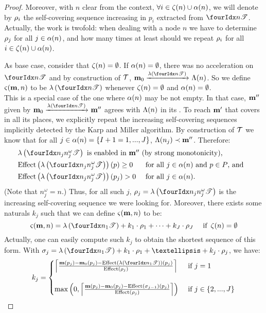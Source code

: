 \begin{proof}
  Moreover, with $n$ clear from the context, $\forall i \in \operatorname{\zeta}(n) \cup \operatorname{\alpha}(n)$, we will denote by $\iscs{i}$ the self-covering sequence increasing in $p_i$ extracted from $\treepath{n}$.
  Actually, the work is twofold: when dealing with a node $n$ we have to determine $\iscs{j}$ for all $j \in \operatorname{\alpha}(n)$, and how many times at least should we repeat $\iscs{i}$ for all $i \in \operatorname{\zeta}(n) \cup \operatorname{\alpha}(n)$.

  As base case, consider that $\operatorname{\zeta}(n) = \emptyset$.
  If $\operatorname{\alpha}(n) = \emptyset$, there was no acceleration on $\treepath{n}$ and by construction of $\mathcal{T}$, $\mari \fire{\labt{\treepath{n}}} \lab{n}$.
  So we define $\operatorname{\varsigma}(\mathbf{m},n)$ to be $\labt{\treepath{n}}$ whenever $\operatorname{\zeta}(n) = \emptyset$ and $\operatorname{\alpha}(n) = \emptyset$.\\
  This is a special case of the one where $\operatorname{\alpha}(n)$ may be not empty.
  In that case, $\mathbf{m}''$ given by $\mari \fire{\labt{\treepath{n}}} \mar''$ agrees with $\operatorname{\Lambda}(n)$ in its \noplaces.
  To reach $\mathbf{m}'$ that covers \mar in all its places, we explicitly repeat the increasing self-covering sequences implicitly detected by the Karp and Miller algorithm.
  By construction of $\mathcal{T}$ we know that for all $j \in \operatorname{\alpha}(n) = \{I+1 = 1, ..., J\}$, $\operatorname{\Lambda}(n_j) \prec \mathbf{m}''$.
  Therefore:
  \begin{align*}
    &\makebox[0pt][l]{\,\(\labt{\treepath[n_j]{n^\omega_j}}\text{ is enabled in }\mar''\text{ (by strong monotonicity), }\)} \\
    &\effect{\labt{\treepath[n_j]{n^\omega_j}}}(p) \geq 0 &&\text{ for all }j \in \na{n}\text{ and }p \in \places \text{, and} \\
    &\effect{\labt{\treepath[n_j]{n^\omega_j}}}(p_j) > 0  &&\text{ for all }j \in \na{n} \text{.}
  \end{align*}
  (Note that $n^\omega_j = n$.)
  Thus, for all such $j$, $\iscs{j} = \labt{\treepath[n_j]{n^\omega_j}}$ is the increasing self-covering sequence we were looking for.
  Moreover, %
  there exists some naturals $k_j$ such that we can define $\operatorname{\varsigma}(\mathbf{m},n)$ to be:
  \[ \tts{\mar}{n} = \labt{\treepath{n_1}} + k_1 \cdot \iscs{1} + \dots + k_J \cdot \iscs{J} \quad\text{ if }\ab{n} = \emptyset \]
  Actually, one can easily compute such $k_j$ to obtain the shortest sequence of this form.
  With $\seqt_j = \labt{\treepath{n_1}} + k_1 \cdot \iscs{1} + … + k_j \cdot \iscs{j}$, we have:
  \[
    k_j =
    \begin{cases}
      \left\lceil
        \frac{\mar(p_j) - \mari(p_j) - \effect{\labt{\treepath{n_1}}}(p_j)}
             {\effect{\iscs{j}}}
      \right\rceil
      &\text{ if } j = 1\\
      \\
      \max\left(0,
        \left\lceil
          \frac{\mar(p_j) - \mari(p_j) - \effect{\seqt_{j-1}}(p_j)}
              {\effect{\iscs{j}}}
        \right\rceil
      \right)
      &\text{ if } j \in \{2, ..., J\}
    \end{cases}
  \]


\end{proof}
